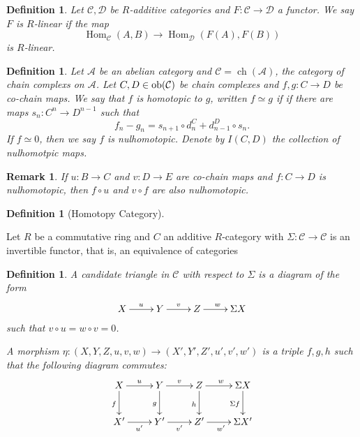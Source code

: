 \documentclass{amsart}
\theoremstyle{thmstyle}
\newtheorem{remark}{Remark}[section]
\theoremstyle{defstyle}
\newtheorem{definition}[theorem]{Definition}
\newcommand{\Hom}{\operatorname{Hom}}
\begin{document}
\begin{definition}
    Let $\mathcal C,\mathcal D$ be $R$-additive categories and $F:\mathcal C\to\mathcal D$ a functor. We say $F$ is $R$-linear if the map 
    \begin{equation*}
        \Hom_{\mathcal C}(A,B)\to\Hom_{\mathcal D}(F(A), F(B))
    \end{equation*}
    is $R$-linear.
\end{definition}


\begin{definition}
    Let $\mathcal A$ be an abelian category and $\mathcal C = \operatorname{ch}(\mathcal A)$, the category of chain complexs on $\mathcal A$. Let $C,D\in\operatorname{ob}(\mathcal C)$ be chain complexes and $f,g: C\to D$ be co-chain maps. We say that $f$ is homotopic to $g$, written $f\simeq g$ if if there are maps $s_n: C^n\to D^{n - 1}$ such that 
    \begin{equation*}
        f_n - g_n = s_{n + 1}\circ d_n^C + d_{n - 1}^D\circ s_n.
    \end{equation*}
    If $f\simeq 0$, then we say $f$ is nulhomotopic. Denote by $I(C,D)$ the collection of nulhomotpic maps.
\end{definition}

\begin{remark}
    If $u: B\to C$ and $v: D\to E$ are co-chain maps and $f: C\to D$ is nulhomotopic, then $f\circ u$ and $v\circ f$ are also nulhomotopic. 
\end{remark}

\begin{definition}[Homotopy Category]
    
\end{definition}

Let $R$ be a commutative ring and $C$ an additive $R$-category with $\Sigma:\mathcal C\to\mathcal C$ is an invertible functor, that is, an equivalence of categories

\begin{definition}
    A candidate triangle in $\mathcal C$ with respect to $\Sigma$ is a diagram of the form 
    \begin{equation*}
        \xymatrix {
            X\ar[r]^u & Y\ar[r]^v & Z\ar[r]^w & \Sigma X
        }
    \end{equation*}
    such that $v\circ u = w\circ v = 0$.

    A morphism $\eta:(X,Y,Z,u,v,w)\to (X',Y',Z',u',v',w')$ is a triple $f,g,h$ such that the following diagram commutes: 
    \begin{equation*}
        \xymatrix {
            X\ar[d]_f\ar[r]^u & Y\ar[d]_g\ar[r]^v & Z\ar[d]_h\ar[r]^w & \Sigma X\ar[d]_{\Sigma f}\\
            X'\ar[r]_{u'} & Y'\ar[r]_{v'} & Z'\ar[r]_{w'} & \Sigma X'
        }
    \end{equation*}
\end{definition}
\end{document}
